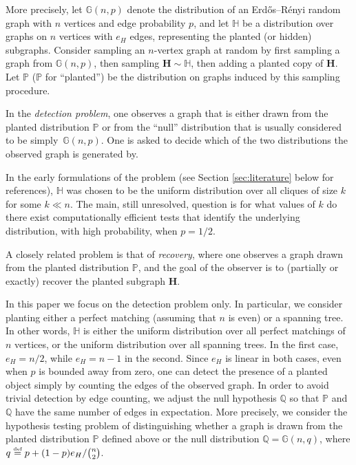 \documentclass[11pt]{article}
\newcommand{\bH}{\mathbf{H}}
\newcommand{\bbG}{\mathbb{G}}
\newcommand{\bbH}{\mathbb{H}}
\newcommand{\bbP}{\mathbb{P}}
\newcommand{\bbQ}{\mathbb{Q}}
\newcommand\defeq{\stackrel{\text{\tiny def}}{=}}
\numberwithin{equation}{section}
\numberwithin{thm}{section}
\begin{document}
More precisely, let $\bbG(n,p)$ denote the distribution of an Erd\H{o}s--R\'enyi random graph with $n$ vertices and edge probability $p$, and let $\bbH$ be a distribution over graphs on $n$ vertices with $e_H$ edges, representing the planted (or hidden) subgraphs. 
Consider sampling an $n$-vertex graph at random by first sampling a graph from $\bbG(n,p)$, then sampling $\bH \sim \bbH$, then adding a planted copy of $\bH$.
Let $\bbP$ ($\bbP$ for ``planted'') be the distribution on graphs induced by this sampling procedure.

In the \emph{detection problem}, one observes a graph that is either drawn from the planted distribution $\bbP$ or from the ``null'' distribution that is usually considered to be simply~$\bbG(n,p)$. One is asked to decide which of the two distributions the observed graph is generated by. 

In the early formulations of the problem (see Section \ref{sec:literature} below for references), $\bbH$ was chosen to be the uniform distribution over all cliques of size $k$ for some $k\ll n$.  The main, still unresolved, question is for what values of $k$ do there exist computationally efficient tests that identify the underlying distribution, with high probability, when $p=1/2$.

A closely related problem is that of \emph{recovery}, where one observes a graph drawn from the planted distribution $\bbP$, and the goal of the observer is to (partially or exactly) recover the planted subgraph $\bH$. 

In this paper we focus on the detection problem only. In particular, we consider planting either a perfect matching (assuming that $n$ is even) or a spanning tree. 
In other words, $\bbH$ is either the uniform distribution over all perfect matchings of $n$ vertices, or the uniform distribution over all  spanning trees. In the first case, $e_H=n/2$, while $e_H=n-1$ in the second. Since $e_H$ is linear in both cases, even when $p$ is bounded away from zero, one can detect the presence of a planted object simply by counting the edges of the observed graph. In order to avoid trivial detection by edge counting, we adjust the null hypothesis $\bbQ$ so that  $\bbP$ and $\bbQ$ have the same number of edges in expectation.
More precisely, we consider the hypothesis testing problem of distinguishing whether a graph is drawn from the planted distribution $\bbP$ defined above or the null distribution $\bbQ = \bbG(n,q)$, where $q \defeq p + (1-p)e_H/\binom{n}{2}$.
\end{document}
